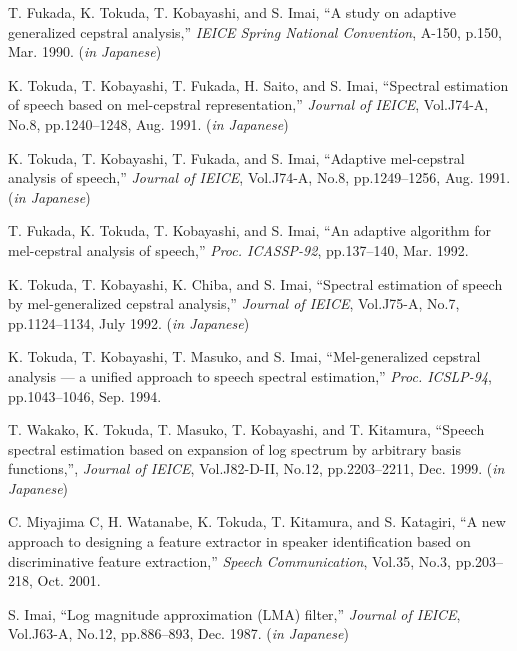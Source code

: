 \begin{thebibliography}{99}
T. Fukada, K. Tokuda, T. Kobayashi, and S. Imai,
``A study on adaptive generalized cepstral analysis,''
{\sl IEICE Spring National Convention},
A-150, p.150, Mar. 1990. ({\sl in Japanese})



K. Tokuda, T. Kobayashi, T. Fukada, H. Saito, and S. Imai,
``Spectral estimation of speech based on mel-cepstral representation,''
{\sl Journal of IEICE},
Vol.J74-A, No.8, pp.1240--1248, Aug. 1991. ({\sl in Japanese})

K. Tokuda, T. Kobayashi, T. Fukada, and S. Imai,
``Adaptive mel-cepstral analysis of speech,''
{\sl Journal of IEICE},
Vol.J74-A, No.8, pp.1249--1256, Aug. 1991. ({\sl in Japanese})

T. Fukada, K. Tokuda, T. Kobayashi, and S. Imai, 
``An adaptive algorithm for mel-cepstral analysis of speech,''
{\sl Proc. ICASSP-92}, %
  pp.137--140, %
  Mar. 1992.



K. Tokuda, T. Kobayashi, K. Chiba, and S. Imai,
``Spectral estimation of speech by mel-generalized cepstral analysis,''
{\sl Journal of IEICE},
Vol.J75-A, No.7, pp.1124--1134, July 1992. ({\sl in Japanese})

K. Tokuda, T. Kobayashi, T. Masuko, and S. Imai,
``Mel-generalized cepstral analysis --- a unified approach to speech spectral estimation,''
{\sl Proc. ICSLP-94}, 
pp.1043--1046, Sep. 1994.



T. Wakako, K. Tokuda, T. Masuko, T. Kobayashi, and T. Kitamura,
``Speech spectral estimation based on expansion of log spectrum by arbitrary basis functions,'',
{\sl Journal of IEICE},
Vol.J82-D-II, No.12, pp.2203--2211, Dec. 1999. ({\sl in Japanese})

C. Miyajima C, H. Watanabe, K. Tokuda, T. Kitamura, and S. Katagiri,
``A new approach to designing a feature extractor in speaker identification based on discriminative feature extraction,''
{\sl Speech Communication},
Vol.35, No.3, pp.203--218, Oct. 2001.



S. Imai,
``Log magnitude approximation (LMA) filter,''
{\sl Journal of IEICE},
Vol.J63-A, No.12, pp.886--893, Dec. 1987. ({\sl in Japanese})


\end{thebibliography}
